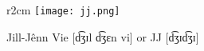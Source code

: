 \documentclass[a4paper,10pt]{article}
\begin{document}
\pagestyle{empty}
\begin{wrapfigure}{r}{2cm}
\vspace{-3mm}
\texttt{[image: jj.png]}
\end{wrapfigure}
\noindent
{\LARGE Jill-Jênn Vie} [d͡ʒɪl d͡ʒɛn vi] or JJ [d͡ʒɪd͡ʒɪ]\\[1mm]

\end{document}
